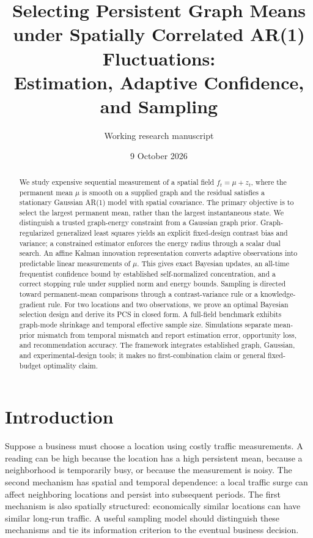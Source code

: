\documentclass[11pt]{article}
\title{Selecting Persistent Graph Means\\under Spatially Correlated AR(1) Fluctuations:\\Estimation, Adaptive Confidence, and Sampling}
\author{Working research manuscript}
\date{9 October 2026}
\begin{document}
\maketitle
\begin{abstract}
We study expensive sequential measurement of a spatial field $f_t=\mu+z_t$, where the permanent mean $\mu$ is smooth on a supplied graph and the residual satisfies a stationary Gaussian AR(1) model with spatial covariance. The primary objective is to select the largest permanent mean, rather than the largest instantaneous state. We distinguish a trusted graph-energy constraint from a Gaussian graph prior. Graph-regularized generalized least squares yields an explicit fixed-design contrast bias and variance; a constrained estimator enforces the energy radius through a scalar dual search. An affine Kalman innovation representation converts adaptive observations into predictable linear measurements of $\mu$. This gives exact Bayesian updates, an all-time frequentist confidence bound by established self-normalized concentration, and a correct stopping rule under supplied norm and energy bounds. Sampling is directed toward permanent-mean comparisons through a contrast-variance rule or a knowledge-gradient rule. For two locations and two observations, we prove an optimal Bayesian selection design and derive its PCS in closed form. A full-field benchmark exhibits graph-mode shrinkage and temporal effective sample size. Simulations separate mean-prior mismatch from temporal mismatch and report estimation error, opportunity loss, and recommendation accuracy. The framework integrates established graph, Gaussian, and experimental-design tools; it makes no first-combination claim or general fixed-budget optimality claim.
\end{abstract}

\section{Introduction}
Suppose a business must choose a location using costly traffic measurements. A reading can be high because the location has a high persistent mean, because a neighborhood is temporarily busy, or because the measurement is noisy. The second mechanism has spatial and temporal dependence: a local traffic surge can affect neighboring locations and persist into subsequent periods. The first mechanism is also spatially structured: economically similar locations can have similar long-run traffic. A useful sampling model should distinguish these mechanisms and tie its information criterion to the eventual business decision.
\end{document}
